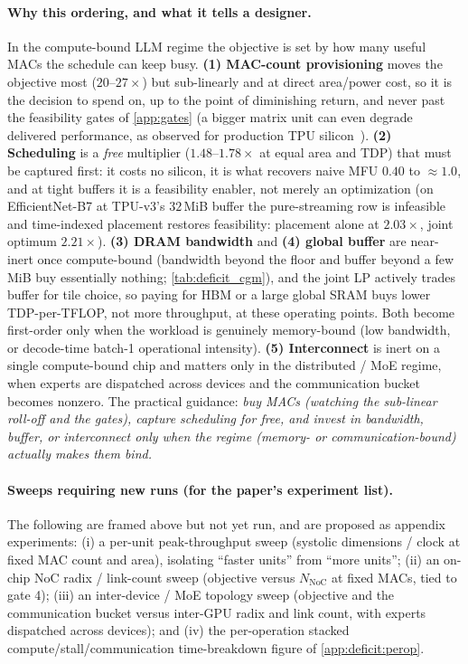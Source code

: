 \paragraph{Why this ordering, and what it tells a designer.}
In the compute-bound LLM regime the objective is set by how many useful MACs the
schedule can keep busy. \textbf{(1) MAC-count provisioning} moves the objective
most ($20$--$27\times$) but sub-linearly and at direct area/power cost, so it is
the decision to spend on, up to the point of diminishing return, and never past
the feasibility gates of \cref{app:gates} (a bigger matrix unit can even degrade
delivered performance, as observed for production TPU
silicon~\citep{jouppi2017datacenter}). \textbf{(2) Scheduling} is a
\emph{free} multiplier ($1.48$--$1.78\times$ at equal area and TDP) that must be
captured first: it costs no silicon, it is what recovers naive MFU $0.40$ to
$\approx1.0$, and at tight buffers it is a feasibility enabler, not merely an
optimization (on EfficientNet-B7 at TPU-v3's $32$\,MiB buffer the pure-streaming
row is infeasible and time-indexed placement restores feasibility: placement
alone at $2.03\times$, joint optimum $2.21\times$). \textbf{(3) DRAM bandwidth} and \textbf{(4) global buffer} are
near-inert once compute-bound (bandwidth beyond the floor and buffer beyond a
few MiB buy essentially nothing; \cref{tab:deficit_cgm}), and the joint LP
actively trades buffer for tile choice, so paying for HBM or a large global SRAM
buys lower TDP-per-TFLOP, not more throughput, at these operating points. Both
become first-order only when the workload is genuinely memory-bound (low
bandwidth, or decode-time batch-1 operational intensity). \textbf{(5)
Interconnect} is inert on a single compute-bound chip and matters only in the
distributed / MoE regime, when experts are dispatched across devices and the
communication bucket becomes nonzero. The practical guidance: \emph{buy MACs
(watching the sub-linear roll-off and the gates), capture scheduling for free,
and invest in bandwidth, buffer, or interconnect only when the regime (memory-
or communication-bound) actually makes them bind.}

\paragraph{Sweeps requiring new runs (for the paper's experiment list).}
The following are framed above but not yet run, and are proposed as appendix
experiments: (i) a per-unit peak-throughput sweep (systolic dimensions / clock
at fixed MAC count and area), isolating ``faster units'' from ``more units'';
(ii) an on-chip NoC radix / link-count sweep (objective versus $N_{\mathrm{NoC}}$
at fixed MACs, tied to gate 4); (iii) an inter-device / MoE topology sweep
(objective and the communication bucket versus inter-GPU radix and link count,
with experts dispatched across devices); and (iv) the per-operation stacked
compute/stall/communication time-breakdown figure of \cref{app:deficit:perop}.
